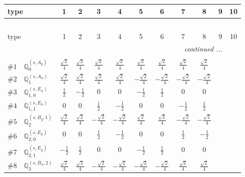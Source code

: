\documentclass[fleqn,9pt,landscape]{jsarticle}
\begin{document}
\begin{center}
\renewcommand{\arraystretch}{1.3}
\begin{longtable}{lcccccccccc}
 \hline \hline
type & 1 & 2 & 3 & 4 & 5 & 6 & 7 & 8 & 9 & 10 \\ \hline \endfirsthead

\multicolumn{10}{l}{\tablename\ \thetable{}} \\
 \hline \hline
type & 1 & 2 & 3 & 4 & 5 & 6 & 7 & 8 & 9 & 10 \\ \hline \endhead

 \hline \hline
\multicolumn{10}{r}{\footnotesize\it continued ...} \\ \endfoot

 \hline \hline
\multicolumn{10}{r}{} \\ \endlastfoot

$ \#1\quad \mathbb{Q}_{0}^{(s,A_{g})} $ & $ \frac{\sqrt{2}}{4} $ & $ \frac{\sqrt{2}}{4} $ & $ \frac{\sqrt{2}}{4} $ & $ \frac{\sqrt{2}}{4} $ & $ \frac{\sqrt{2}}{4} $ & $ \frac{\sqrt{2}}{4} $ & $ \frac{\sqrt{2}}{4} $ & $ \frac{\sqrt{2}}{4} $ \\ \hline
$ \#2\quad \mathbb{Q}_{1}^{(s,A_{u})} $ & $ \frac{\sqrt{2}}{4} $ & $ \frac{\sqrt{2}}{4} $ & $ \frac{\sqrt{2}}{4} $ & $ \frac{\sqrt{2}}{4} $ & $ - \frac{\sqrt{2}}{4} $ & $ - \frac{\sqrt{2}}{4} $ & $ - \frac{\sqrt{2}}{4} $ & $ - \frac{\sqrt{2}}{4} $ \\ \hline
$ \#3\quad \mathbb{Q}_{1,0}^{(s,E_{u})} $ & $ \frac{1}{2} $ & $ - \frac{1}{2} $ & $ 0 $ & $ 0 $ & $ - \frac{1}{2} $ & $ \frac{1}{2} $ & $ 0 $ & $ 0 $ \\ \hline
$ \#4\quad \mathbb{Q}_{1,1}^{(s,E_{u})} $ & $ 0 $ & $ 0 $ & $ \frac{1}{2} $ & $ - \frac{1}{2} $ & $ 0 $ & $ 0 $ & $ - \frac{1}{2} $ & $ \frac{1}{2} $ \\ \hline
$ \#5\quad \mathbb{Q}_{2}^{(s,B_{g},1)} $ & $ \frac{\sqrt{2}}{4} $ & $ \frac{\sqrt{2}}{4} $ & $ - \frac{\sqrt{2}}{4} $ & $ - \frac{\sqrt{2}}{4} $ & $ \frac{\sqrt{2}}{4} $ & $ \frac{\sqrt{2}}{4} $ & $ - \frac{\sqrt{2}}{4} $ & $ - \frac{\sqrt{2}}{4} $ \\ \hline
$ \#6\quad \mathbb{Q}_{2,0}^{(s,E_{g})} $ & $ 0 $ & $ 0 $ & $ \frac{1}{2} $ & $ - \frac{1}{2} $ & $ 0 $ & $ 0 $ & $ \frac{1}{2} $ & $ - \frac{1}{2} $ \\ \hline
$ \#7\quad \mathbb{Q}_{2,1}^{(s,E_{g})} $ & $ - \frac{1}{2} $ & $ \frac{1}{2} $ & $ 0 $ & $ 0 $ & $ - \frac{1}{2} $ & $ \frac{1}{2} $ & $ 0 $ & $ 0 $ \\ \hline
$ \#8\quad \mathbb{Q}_{3}^{(s,B_{u},2)} $ & $ \frac{\sqrt{2}}{4} $ & $ \frac{\sqrt{2}}{4} $ & $ - \frac{\sqrt{2}}{4} $ & $ - \frac{\sqrt{2}}{4} $ & $ - \frac{\sqrt{2}}{4} $ & $ - \frac{\sqrt{2}}{4} $ & $ \frac{\sqrt{2}}{4} $ & $ \frac{\sqrt{2}}{4} $ \\
\end{longtable}
\end{center}
\end{document}
